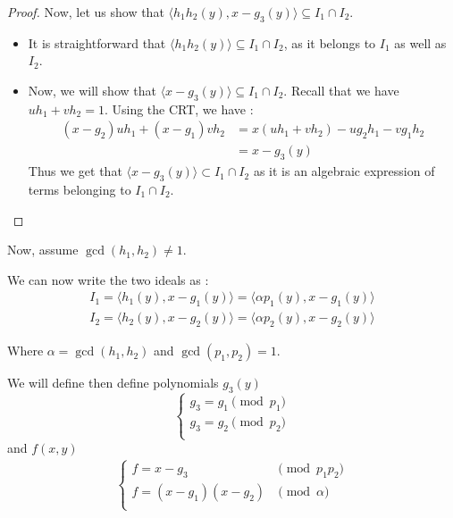 \documentclass{article}
\begin{document}
\begin{flushleft}
\begin{proof}
    Now, let us show that $\langle h_{1}h_{2}(y), x - g_{3}(y) \rangle \subseteq I_{1} \cap I_{2}$.
    \begin{itemize}
        \item It is straightforward that $\langle h_{1}h_{2}(y) \rangle \subseteq I_{1} \cap I_{2}$, as it belongs to $I_{1}$ as well as $I_{2}$.
        \item Now, we will show that  $\langle x - g_{3}(y) \rangle \subseteq I_{1} \cap I_{2}$. Recall that we have $uh_{1} + vh_{2} = 1$.
        Using the CRT, we have : 
        \begin{align*}
            (x - g_{2})uh_{1} + (x - g_{1})vh_{2} 
            & = x(uh_{1} + vh_{2}) - ug_{2}h_{1} - vg_{1}h_{2} \\
            & = x - g_{3}(y)
        \end{align*}
        Thus we get that $\langle x - g_{3}(y) \rangle \subset I_{1} \cap I_{2}$ as it is an algebraic expression of terms belonging to $I_{1} \cap I_{2}$.

    \end{itemize}

\end{proof}


Now, assume $\gcd(h_{1}, {h_2}) \neq 1$.

We can now write the two ideals as : 
\begin{align*}
    I_{1} = \langle h_{1}(y), x - g_{1}(y) \rangle = \langle \alpha p_{1}(y), x - g_{1}(y) \rangle \\
    I_{2} = \langle h_{2}(y), x - g_{2}(y) \rangle = \langle \alpha p_{2}(y), x - g_{2}(y) \rangle
\end{align*}

Where $\alpha = \gcd(h_{1}, h_{2})$ and $\gcd(p_{1}, p_{2}) = 1$.

We will define then define polynomials $g_{3}(y)$ 
\begin{displaymath}
    \left\{
    \begin{array}{ll}
        g_{3} = g_{1} \pmod {p_{1}} \\
        g_{3} = g_{2} \pmod {p_{2}} \\
    \end{array}
    \right.
\end{displaymath}
and $f(x, y)$ 
\begin{align*}
    \left\{
    \begin{array}{ll}
        f = x - g_{3}           & \pmod {p_{1}p_{2}}         \\
        f = (x-g_{1})(x-g_{2})  & \pmod {\alpha}             \\
    \end{array}
    \right.
\end{align*}


\end{flushleft}
\end{document}
